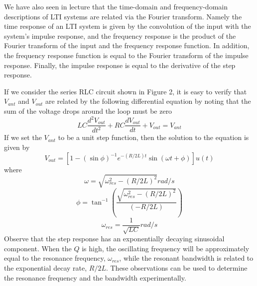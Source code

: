 \documentclass[utf8]{article}
\begin{document}
{	We have also seen in lecture that the time-domain and frequency-domain descriptions of LTI systems are related via the Fourier transform. Namely the time response of an LTI system is given by the convolution of the input with the system’s impulse response, and the frequency response is the product of the Fourier transform of the input and the frequency response function. In addition, the frequency response function is equal to the Fourier transform of the impulse response. Finally, the impulse response is equal to the derivative of the step response.

	If we consider the series RLC circuit shown in Figure 2, it is easy to verify that $V_{ant}$ and $V_{out}$ are related by the following differential equation by noting that the sum of the voltage drops around the loop must be zero
	$$LC\frac{d^2V_{out}}{dt^2}+RC\frac{dV_{out}}{dt}+V_{out} = V_{ant}$$
	If we set the $V_{ant}$ to be a unit step function, then the solution to the equation is given by
	$$V_{out} = [1-(\sin\phi)^{-1}e^{-(R/2L)t}\sin(\omega t+\phi)]u(t)$$
	where
	$$\omega = \sqrt{\omega_{res}^2-(R/2L)^2}rad/s$$
	$$\phi = \tan^{-1}(\frac{\sqrt{\omega_{res}^2-(R/2L)^2}}{(-R/2L)})$$
	$$\omega_{res} = \frac{1}{\sqrt{LC}}rad/s$$
	Observe that the step response has an exponentially decaying sinusoidal component. When the $Q$ is high, the oscillating frequency will be approximately equal to the resonance frequency, $\omega_{res}$, while the resonant bandwidth is related to the exponential decay rate, $R/2L$. These observations can be used to determine the resonance frequency and the bandwidth experimentally.
}
\end{document}
